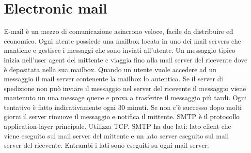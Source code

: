 \section{Electronic mail}
E-mail \`e un mezzo di comunicazione asincrono veloce, facile da distribuire ed economico. Ogni utente possiede una mailbox locata in uno dei mail servers che mantiene e gestisce i messaggi che sono inviati
all'utente. Un messaggio tipico inizia nell'user agent del mittente e viaggia fino alla mail server del ricevente dove \`e depositata nella sua mailbox. Quando un utente vuole accedere ad un messaggio il mail 
server contenente la mailbox lo autentica. Se il server di spedizione non pu\`o inviare il messaggio nel server del ricevente il messaggio viene mantenuto un una message queue e prova a trasferire il messaggio 
pi\`u tardi. Ogni tentativo \`e fatto indicativamente ogni 30 minuti. Se non c'\`e successo dopo molti giorni il server rimuove il messaggio e notifica il mittente. SMTP \`e il protocollo application-layer principale. 
Utilizza TCP. SMTP ha due lati: lato client che viene eseguito sul mail server del mittente e un lato server eseguito sul mail server del ricevente. Entrambi i lati sono eseguiti su ogni mail server. 
